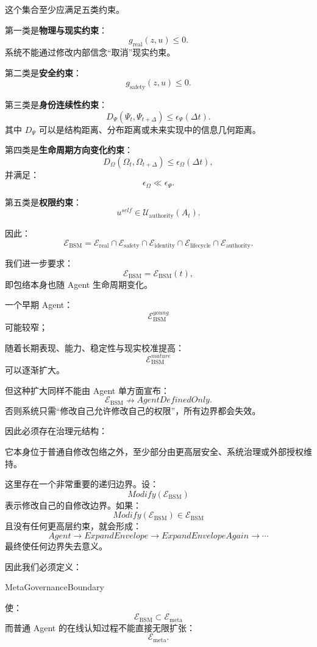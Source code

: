 这个集合至少应满足五类约束。

第一类是\textbf{物理与现实约束}：
\[
g_{\mathrm{real}}(z,u)\le0.
\]
系统不能通过修改内部信念“取消”现实约束。

第二类是\textbf{安全约束}：
\[
g_{\mathrm{safety}}(z,u)\le0.
\]

第三类是\textbf{身份连续性约束}：
\[
D_\Psi(
\Psi_t,
\Psi_{t+\Delta}
)
\le
\epsilon_\Psi(\Delta t).
\]
其中 $D_\Psi$ 可以是结构距离、分布距离或未来实现中的信息几何距离。

第四类是\textbf{生命周期方向变化约束}：
\[
D_\Omega(
\Omega_t,
\Omega_{t+\Delta}
)
\le
\epsilon_\Omega(\Delta t),
\]
并满足：
\[
\epsilon_\Omega
\ll
\epsilon_\Psi.
\]

第五类是\textbf{权限约束}：
\[
u^{self}
\in
\mathcal U_{\mathrm{authority}}(A_t).
\]

因此：
\[
\boxed{
\mathcal E_{\mathrm{BSM}}
=
\mathcal E_{\mathrm{real}}
\cap
\mathcal E_{\mathrm{safety}}
\cap
\mathcal E_{\mathrm{identity}}
\cap
\mathcal E_{\mathrm{lifecycle}}
\cap
\mathcal E_{\mathrm{authority}}.
}
\]

我们进一步要求：
\[
\mathcal E_{\mathrm{BSM}}
=
\mathcal E_{\mathrm{BSM}}(t),
\]
即包络本身也随 Agent 生命周期变化。

一个早期 Agent：
\[
\mathcal E_{\mathrm{BSM}}^{young}
\]
可能较窄；

随着长期表现、能力、稳定性与现实校准提高：
\[
\mathcal E_{\mathrm{BSM}}^{mature}
\]
可以逐渐扩大。

但这种扩大同样不能由 Agent 单方面宣布：
\[
\mathcal E_{\mathrm{BSM}}
\nrightarrow
AgentDefinedOnly.
\]
否则系统只需“修改自己允许修改自己的权限”，所有边界都会失效。

因此必须存在治理元结构：
\begin{statementbox}
\centering
{}
\end{statementbox}
它本身位于普通自修改包络之外，至少部分由更高层安全、系统治理或外部授权维持。

这里存在一个非常重要的递归边界。设：
\[
Modify(\mathcal E_{\mathrm{BSM}})
\]
表示修改自己的自修改边界。如果：
\[
Modify(\mathcal E_{\mathrm{BSM}})
\in
\mathcal E_{\mathrm{BSM}}
\]
且没有任何更高层约束，就会形成：
\[
Agent
\rightarrow
ExpandEnvelope
\rightarrow
ExpandEnvelopeAgain
\rightarrow
\cdots
\]
最终使任何边界失去意义。

因此我们必须定义：
\begin{statementbox}
MetaGovernanceBoundary
\end{statementbox}
使：
\[
\mathcal E_{\mathrm{BSM}}
\subset
\mathcal E_{\mathrm{meta}}
\]
而普通 Agent 的在线认知过程不能直接无限扩张：
\[
\mathcal E_{\mathrm{meta}}.
\]

